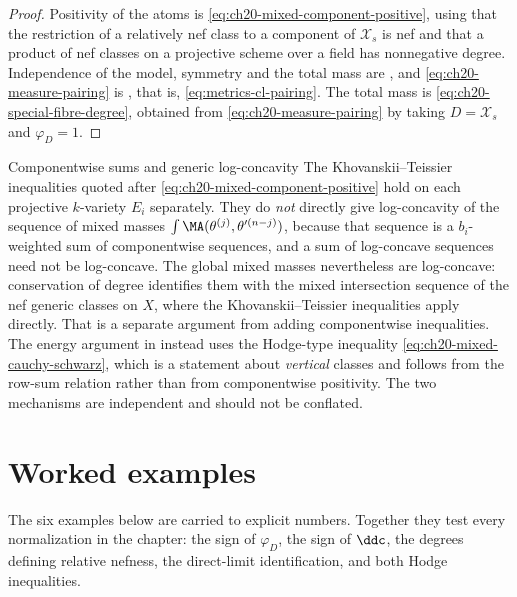 \begin{proof}
Positivity of the atoms is \eqref{eq:ch20-mixed-component-positive}, using
that the restriction of a relatively nef class to a component of
$\mathcal X_s$ is nef and that a product of nef classes on a projective
scheme over a field has nonnegative degree.  Independence of the model,
symmetry and the total mass are , and
\eqref{eq:ch20-measure-pairing} is
, that is,
\eqref{eq:metrics-cl-pairing}.  The total mass is
\eqref{eq:ch20-special-fibre-degree}, obtained from
\eqref{eq:ch20-measure-pairing} by taking $D=\mathcal X_s$ and
$\varphi_D=1$.
\end{proof}

\noindent\begin{minipage}{\textwidth}
\begin{warning}{Componentwise sums and generic log-concavity}
The Khovanskii--Teissier inequalities quoted after
\eqref{eq:ch20-mixed-component-positive} hold on each projective
$k$-variety $E_i$ separately.  They do \emph{not} directly give
log-concavity of the sequence of mixed masses
$\int\MA(\theta^{(j)},\theta'^{(n-j)})$, because that sequence is a
$b_i$-weighted sum of componentwise sequences, and a sum of log-concave
sequences need not be log-concave.  The global mixed masses nevertheless
are log-concave: conservation of degree identifies them with the mixed
intersection sequence of the nef generic classes on $X$, where the
Khovanskii--Teissier inequalities apply directly.  That is a separate
argument from adding componentwise inequalities.  The energy argument in
 instead uses the Hodge-type inequality
\eqref{eq:ch20-mixed-cauchy-schwarz}, which is a statement about
\emph{vertical} classes and follows from the row-sum relation rather than
from componentwise positivity.  The two mechanisms are independent and
should not be conflated.
\end{warning}
\end{minipage}\par

\section{Worked examples}
\label{sec:ch20-examples}

The six examples below are carried to explicit numbers.  Together they test
every normalization in the chapter: the sign of $\varphi_D$, the sign of
$\ddc$, the degrees defining relative nefness, the direct-limit
identification, and both Hodge inequalities.

